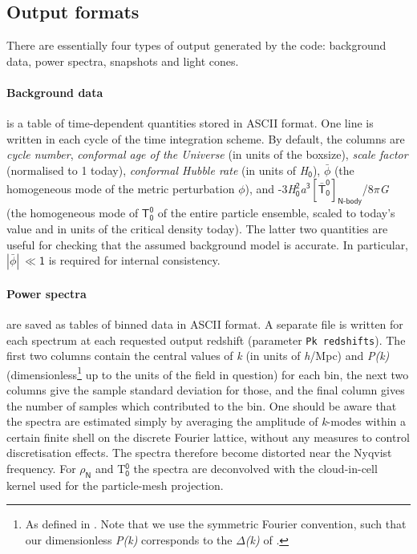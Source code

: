 \documentclass[a4paper,10pt]{article}
\begin{document}
\subsection{Output formats}
\label{sec:output}

There are essentially four types of output generated by the code: background data, power spectra, snapshots and light cones.

\paragraph{Background data} is a table of time-dependent quantities stored in ASCII format. One line is written in each cycle of the time
integration scheme. By default, the columns are \textit{cycle number}, \textit{conformal age of the Universe} (in units of the boxsize),
\textit{scale factor} (normalised to 1 today), \textit{conformal Hubble rate} (in units of \textit{H}${}_\mathsf{0}$), $\bar{\mathsf{\phi}}$
(the homogeneous mode of the metric perturbation $\mathsf{\phi}$), and -3\textit{H}${}_\mathsf{0}^\mathsf{2}$\textit{a}$^\mathsf{3}
[\mathsf{\bar{T}^0_0}]_\mathsf{N\text{-}body}$/8$\mathsf{\pi}$\textit{G} (the homogeneous mode of $\mathsf{T^0_0}$ of the entire particle
ensemble, scaled to today's value and in units of the critical density today). The latter two quantities are useful for checking that the
assumed background model is accurate. In particular, $|\bar{\mathsf{\phi}}|~ \mathsf{\ll 1}$ is required for internal consistency.

\paragraph{Power spectra} are saved as tables of binned data in ASCII format. A separate file is written for each spectrum at each requested
output redshift (parameter \texttt{Pk redshifts}). The first two columns contain the central values of \textit{k} (in units of
\textit{h}/Mpc) and \textit{P(k)} (dimensionless\footnote{As defined in \cite{Adamek:2015eda}. Note that we use the symmetric Fourier
convention, such that our dimensionless \textit{P(k)} corresponds to the $\mathsf{\Delta}$\textit{(k)} of \cite{Bernardeau:2001qr}.} up to the
units of the field in question) for
each bin, the next two columns give the sample standard deviation for those, and the final column gives the number of samples which
contributed to the bin.
One should be aware that the spectra are estimated simply by averaging the amplitude of \textit{k}-modes within a certain finite shell on
the discrete Fourier lattice, without any measures to control discretisation effects. The spectra therefore become distorted near the
Nyqvist frequency. For $\mathsf{\rho}_\mathsf{N}$ and T$^\mathsf{0}_\mathsf{0}$ the spectra are deconvolved with the cloud-in-cell kernel
used for the particle-mesh projection.
\end{document}
